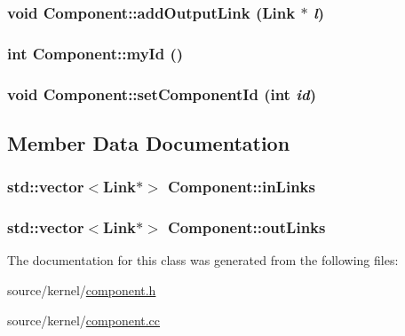\hypertarget{classComponent_aed97b38bbc44deddf329aa473e23b25}{
\subsubsection[{addOutputLink}]{\setlength{\rightskip}{0pt plus 5cm}void Component::addOutputLink ({\bf Link} $\ast$ {\em l})}}
\label{classComponent_aed97b38bbc44deddf329aa473e23b25}


\hypertarget{classComponent_af44955457bc84fa39a346ee70db916f}{
\subsubsection[{myId}]{\setlength{\rightskip}{0pt plus 5cm}int Component::myId ()}}
\label{classComponent_af44955457bc84fa39a346ee70db916f}


\hypertarget{classComponent_4a5ca86f7a92e163287c4aae16f6b4b2}{
\subsubsection[{setComponentId}]{\setlength{\rightskip}{0pt plus 5cm}void Component::setComponentId (int {\em id})}}
\label{classComponent_4a5ca86f7a92e163287c4aae16f6b4b2}




\subsection{Member Data Documentation}
\hypertarget{classComponent_6c43e56775c15cfcc1c0e8a6cbc7c474}{
\subsubsection[{inLinks}]{\setlength{\rightskip}{0pt plus 5cm}std::vector$<${\bf Link}$\ast$$>$ {\bf Component::inLinks}}}
\label{classComponent_6c43e56775c15cfcc1c0e8a6cbc7c474}


\hypertarget{classComponent_4f715c718ecdb440f200e954b5d35b10}{
\subsubsection[{outLinks}]{\setlength{\rightskip}{0pt plus 5cm}std::vector$<${\bf Link}$\ast$$>$ {\bf Component::outLinks}}}
\label{classComponent_4f715c718ecdb440f200e954b5d35b10}




The documentation for this class was generated from the following files:\begin{CompactItemize}
\item 
source/kernel/\hyperlink{component_8h}{component.h}\item 
source/kernel/\hyperlink{component_8cc}{component.cc}\end{CompactItemize}
